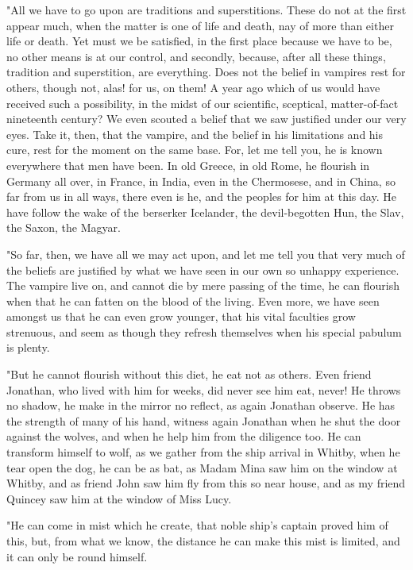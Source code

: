 "All we have to go upon are traditions and superstitions. These do not at the first appear much, when the matter is one of life and death, nay of more than either life or death. Yet must we be satisfied, in the first place because we have to be, no other means is at our control, and secondly, because, after all these things, tradition and superstition, are everything. Does not the belief in vampires rest for others, though not, alas! for us, on them! A year ago which of us would have received such a possibility, in the midst of our scientific, sceptical, matter-of-fact nineteenth century? We even scouted a belief that we saw justified under our very eyes. Take it, then, that the vampire, and the belief in his limitations and his cure, rest for the moment on the same base. For, let me tell you, he is known everywhere that men have been. In old Greece, in old Rome, he flourish in Germany all over, in France, in India, even in the Chermosese, and in China, so far from us in all ways, there even is he, and the peoples for him at this day. He have follow the wake of the berserker Icelander, the devil-begotten Hun, the Slav, the Saxon, the Magyar. 

"So far, then, we have all we may act upon, and let me tell you that very much of the beliefs are justified by what we have seen in our own so unhappy experience. The vampire live on, and cannot die by mere passing of the time, he can flourish when that he can fatten on the blood of the living. Even more, we have seen amongst us that he can even grow younger, that his vital faculties grow strenuous, and seem as though they refresh themselves when his special pabulum is plenty. 

"But he cannot flourish without this diet, he eat not as others. Even friend Jonathan, who lived with him for weeks, did never see him eat, never! He throws no shadow, he make in the mirror no reflect, as again Jonathan observe. He has the strength of many of his hand, witness again Jonathan when he shut the door against the wolves, and when he help him from the diligence too. He can transform himself to wolf, as we gather from the ship arrival in Whitby, when he tear open the dog, he can be as bat, as Madam Mina saw him on the window at Whitby, and as friend John saw him fly from this so near house, and as my friend Quincey saw him at the window of Miss Lucy. 

"He can come in mist which he create, that noble ship's captain proved him of this, but, from what we know, the distance he can make this mist is limited, and it can only be round himself. 

